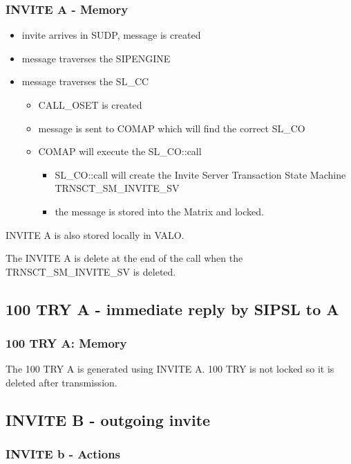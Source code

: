 \documentclass[a4paper]{report}
\begin{document}
\subsubsection{INVITE A - Memory}

\begin {itemize}
\item invite arrives in SUDP, message is created
\item message traverses the SIPENGINE
\item message traverses the SL\_CC
\begin {itemize}
\item CALL\_OSET is created
\item message is sent to COMAP which will find the correct SL\_CO
\item COMAP will execute the SL\_CO::call
\begin {itemize}
\item SL\_CO::call will create the Invite Server Transaction State Machine TRNSCT\_SM\_INVITE\_SV
\item the message is stored into the Matrix and locked.
\end{itemize}
\end{itemize}
\end{itemize}

INVITE A is also stored locally in VALO.

The INVITE A is delete at the end of the call when the TRNSCT\_SM\_INVITE\_SV is deleted.

\subsection{100 TRY A - immediate reply by SIPSL to A}

\subsubsection{100 TRY A: Memory}
The 100 TRY A is generated using INVITE A. 100 TRY is not locked so it is deleted after transmission.

\subsection{INVITE B - outgoing invite}
\subsubsection{INVITE b - Actions}
\end{document}
